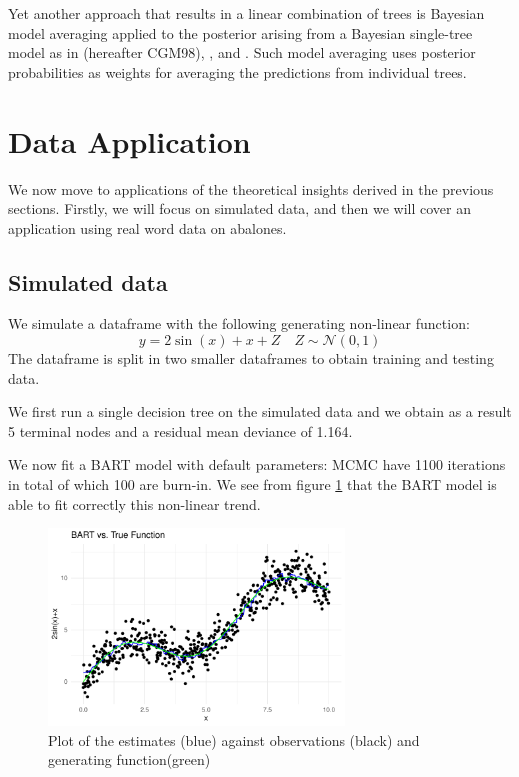 \documentclass[a4paper,11pt]{article}
\begin{document}
Yet another approach that results in a linear combination of trees is Bayesian model averaging applied to the posterior arising from a Bayesian single-tree model as in \cite{chipman1998} (hereafter CGM98), \cite{denison1998}, \cite{blanchard2004} and \cite{wu2007}. Such model averaging uses posterior probabilities as weights for averaging the predictions from individual trees.
  
\section{Data Application}

We now move to applications of the theoretical insights derived in the previous sections. Firstly, we will focus on simulated data, and then we will cover an application using real word data on abalones.

\subsection{Simulated data}
We simulate a dataframe with the following generating non-linear function:
\begin{equation}
  y = 2\sin(x)+x+Z \quad Z \sim \mathcal{N}(0,1)
\end{equation}
The dataframe is split in two smaller dataframes to obtain training and testing data.

We first run a single decision tree on the simulated data and we obtain as a result 5 terminal nodes and a 
residual mean deviance of 1.164. 

We now fit a BART model with default parameters:  MCMC have 1100 iterations in total of which 100 are burn-in. We see from figure \ref{plot_sin1} that the BART model is able to fit correctly this non-linear trend.

\begin{figure}
  \centering
  \includegraphics[width=0.7\textwidth]{../outputs/sin_plot.pdf}
  \caption{Plot of the estimates (blue) against observations (black) and generating function(green)}
  \label{plot_sin1}
\end{figure}
\end{document}
